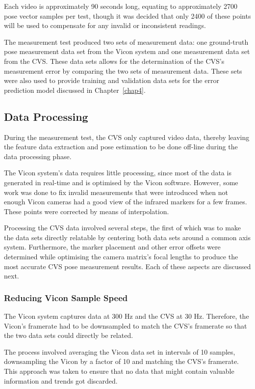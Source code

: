 Each video is approximately 90 seconds long, equating to approximately 2700 pose vector samples per test, though it was decided that only 2400 of these points will be used to compensate for any invalid or inconsistent readings. 

The measurement test produced two sets of measurement data: one ground-truth pose measurement data set from the Vicon system and one measurement data set from the CVS\@. These data sets allows for the determination of the CVS's measurement error by comparing the two sets of measurement data. These sets were also used to provide training and validation data sets for the error prediction model discussed in Chapter~\ref{chap4}. 

\subsection{Data Processing}

During the measurement test, the CVS only captured video data, thereby leaving the feature data extraction and pose estimation to be done off-line during the data processing phase. 

The Vicon system's data requires little processing, since most of the data is generated in real-time and is optimised by the Vicon software. However, some work was done to fix invalid measurements that were introduced when not enough Vicon cameras had a good view of the infrared markers for a few frames. These points were corrected by means of interpolation.

Processing the CVS data involved several steps, the first of which was to make the data sets directly relatable by centering both data sets around a common axis system. Furthermore, the marker placement and other error offsets were determined while optimising the camera matrix's focal lengths to produce the most accurate CVS pose measurement results. Each of these aspects are discussed next.

\subsubsection{Reducing Vicon Sample Speed}

The Vicon system captures data at 300 Hz and the CVS at 30 Hz. Therefore, the Vicon's framerate had to be downsampled to match the CVS's framerate so that the two data sets could directly be related. 

The process involved averaging the Vicon data set in intervals of 10 samples, downsampling the Vicon by a factor of 10 and matching the CVS's framerate. This approach was taken to ensure that no data that might contain valuable information and trends got discarded. 


